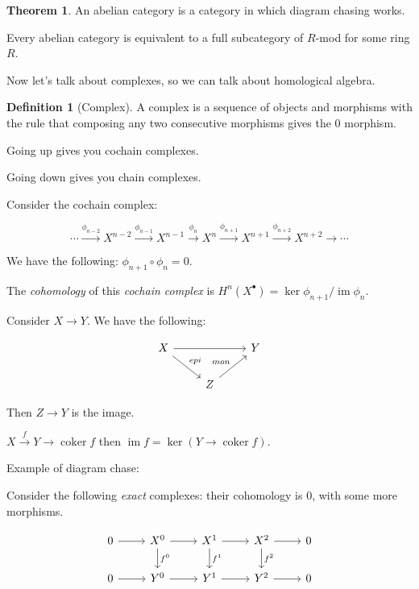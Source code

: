 \documentclass{article}
\theoremstyle{definition}
\newtheorem*{definition}{Definition}
\newtheorem{theorem}{Theorem}
\begin{document}
    \begin{theorem}
        An abelian category is a category in which diagram chasing works.
    \end{theorem}

    Every abelian category is equivalent to a full subcategory of \(R\)-mod for some ring \(R\).

    Now let's talk about complexes, so we can talk about homological algebra.

    \begin{definition}
        [Complex] A complex is a sequence of objects and morphisms with the rule that composing any two consecutive morphisms gives the \(0\) morphism.
    \end{definition}

    Going up gives you cochain complexes.

    Going down gives you chain complexes.

    Consider the cochain complex:

    \[
        \cdots \xrightarrow{\phi_{n-2}} X^{n-2} \xrightarrow{\phi_{n-1}} X^{n-1} \xrightarrow{\phi_n} X^n \xrightarrow{\phi_{n+1}} X^{n+1} \xrightarrow{\phi_{n+2}} X^{n+2} \to \cdots 
    \]

    We have the following: \(\phi_{n+1} \circ \phi_n = 0\).

    The \textit{cohomology} of this \textit{cochain complex} is \(H^n(X^\bullet) = \ker \phi_{n+1} / \operatorname{im} \phi_n\).

    Consider \(X \to Y\). We have the following:

    \[
        \begin{tikzcd}
            X \ar[rr] \ar[rd,"epi"] & & Y \\ & Z \ar[ur, "mon"]
        \end{tikzcd}
    \]

    Then \(Z \to Y\) is the image.

    \(X \xrightarrow{f} Y \to \operatorname{coker} f \) then \(\operatorname{im} f = \ker (Y \to \operatorname{coker} f)\).
    
    Example of diagram chase:

    Consider the following \textit{exact} complexes: their cohomology is \(0\), with some more morphisms.

    \[
        \begin{tikzcd}
            0 \ar[r] & X^0 \ar[r] \ar[d,"f^0"] & X^1 \ar[r] \ar[d,"f^1"] & X^2 \ar[r] \ar[d,"f^2"] & 0 \\
            0 \ar[r] & Y^0 \ar[r] & Y^1 \ar[r] & Y^2 \ar[r] & 0
        \end{tikzcd}
    \]
\end{document}
